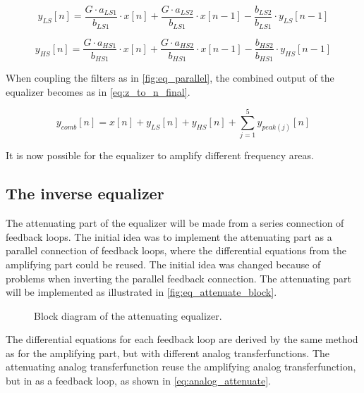 \begin{equation}\label{eq:z_to_n_LS}
        y_{LS}[n] = \frac{G \cdot a_{LS1}}{b_{LS1}} \cdot x[n] + \frac{G \cdot a_{LS2}}{b_{LS1}} \cdot x[n-1] -  \frac{b_{LS2}}{b_{LS1}} \cdot y_{LS}[n-1]
    \end{equation}

\begin{equation}\label{eq:z_to_n_HS}
        y_{HS}[n] = \frac{G \cdot a_{HS1}}{b_{HS1}} \cdot x[n] + \frac{G \cdot a_{HS2}}{b_{HS1}} \cdot x[n-1] -  \frac{b_{HS2}}{b_{HS1}} \cdot y_{HS}[n-1]
    \end{equation}

When coupling the filters as in \autoref{fig:eq_parallel}, the combined output of the equalizer becomes as in \autoref{eq:z_to_n_final}.

\begin{equation}\label{eq:z_to_n_final}
        y_{comb}[n] = x[n] + y_{LS}[n] + y_{HS}[n] + \sum_{j=1}^{5} y_{peak(j)}[n]
    \end{equation}

It is now possible for the equalizer to amplify different frequency areas.

\subsection{The inverse equalizer}
The attenuating part of the equalizer will be made from a series connection of feedback loops. The initial idea was to implement the attenuating part as a parallel connection of feedback loops, where the differential equations from the amplifying part could be reused. The initial idea was changed because of problems when inverting the parallel feedback connection. 
The attenuating part will be implemented as illustrated in \autoref{fig:eq_attenuate_block}.

\begin{figure}[!h]
\centering
\def\svgwidth{0.72\columnwidth}
\scalebox{1}{}
\caption{Block diagram of the attenuating equalizer.}
		\label{fig:eq_attenuate_block}
\end{figure}

The differential equations for each feedback loop are derived by the same method as for the amplifying part, but with different analog transferfunctions. The attenuating analog transferfunction reuse the amplifying analog transferfunction, but in as a feedback loop, as shown in \autoref{eq:analog_attenuate}.

